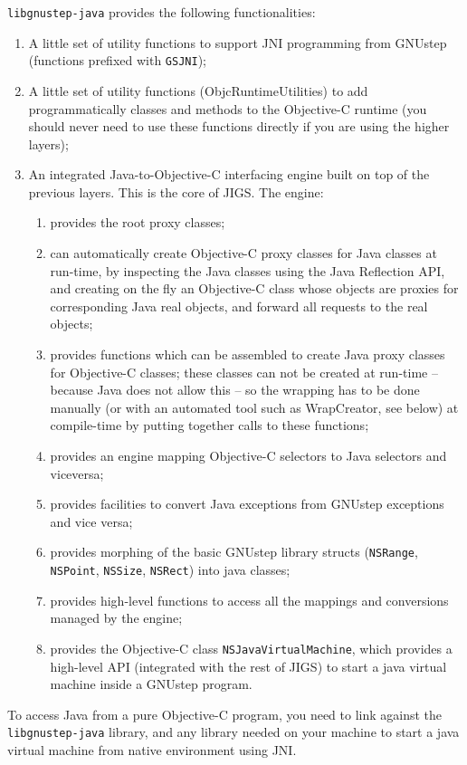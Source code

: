\texttt{libgnustep-java} provides the following functionalities:
\begin{enumerate}
\item A little set of utility functions to support JNI programming
from GNUstep (functions prefixed with \texttt{GSJNI});
\item A little set of utility functions (ObjcRuntimeUtilities) to add
programmatically classes and methods to the Objective-C runtime (you
should never need to use these functions directly if you are using the
higher layers);
\item An integrated Java-to-Objective-C interfacing engine built on
top of the previous layers.  This is the core of JIGS.  The engine:
\begin{enumerate}
\item provides the root proxy classes;
\item can automatically create Objective-C proxy classes for Java
classes at run-time, by inspecting the Java classes using the Java
Reflection API, and creating on the fly an Objective-C class whose
objects are proxies for corresponding Java real objects, and forward
all requests to the real objects;
\item provides functions which can be assembled to create Java proxy
classes for Objective-C classes; these classes can not be created at
run-time -- because Java does not allow this -- so the wrapping has to
be done manually (or with an automated tool such as WrapCreator, see
below) at compile-time by putting together calls to these functions;
\item provides an engine mapping Objective-C selectors to Java
selectors and viceversa;
\item provides facilities to convert Java exceptions from GNUstep
exceptions and vice versa;
\item provides morphing of the basic GNUstep library structs
(\texttt{NSRange}, \texttt{NSPoint}, \texttt{NSSize}, \texttt{NSRect})
into java classes;
\item provides high-level functions to access all the mappings and
conversions managed by the engine;
\item provides the Objective-C class \texttt{NSJavaVirtualMachine},
which provides a high-level API (integrated with the rest of JIGS) to
start a java virtual machine inside a GNUstep program.
\end{enumerate}
\end{enumerate}

To access Java from a pure Objective-C program, you need to link
against the \texttt{libgnustep-java} library, and any library needed
on your machine to start a java virtual machine from native
environment using JNI.

